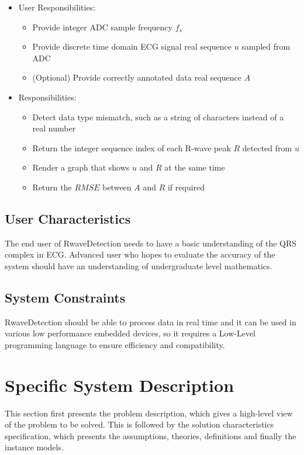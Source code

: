 \documentclass[12pt]{article}
\begin{document}
\begin{itemize}
\item User Responsibilities:
\begin{itemize}
\item Provide integer ADC sample frequency $f_s$
\item Provide discrete time domain ECG signal real sequence $u$ sampled from ADC
\item (Optional) Provide correctly annotated data real sequence $A$
\end{itemize}
\item \progname{} Responsibilities:
\begin{itemize}
\item Detect data type mismatch, such as a string of characters instead of a
  real number
\item Return the integer sequence index of each R-wave peak $R$ detected from
$u$
\item Render a graph that shows $u$ and $R$ at the same time
\item Return the $RMSE$ between $A$ and $R$ if required
\end{itemize}
\end{itemize}

\subsection{User Characteristics} \label{SecUserCharacteristics}

The end user of RwaveDetection needs to have a basic understanding of the QRS
complex in ECG.  Advanced user who hopes to evaluate the accuracy of the system
should have an understanding of undergraduate level mathematics.

\subsection{System Constraints}

RwaveDetection should be able to process data in real time and it can be used in
various low performance embedded devices, so it requires a Low-Level programming
language to ensure efficiency and compatibility.

\section{Specific System Description}

This section first presents the problem description, which gives a high-level
view of the problem to be solved.  This is followed by the solution
characteristics specification, which presents the assumptions, theories,
definitions and finally the instance models.
\end{document}
